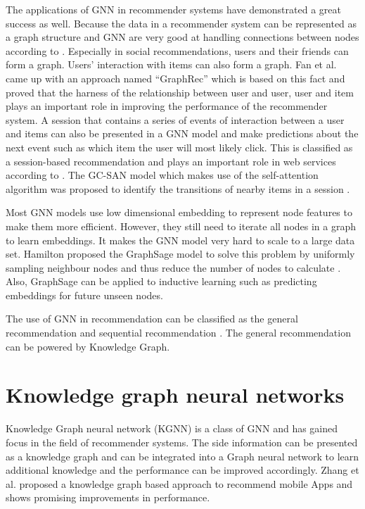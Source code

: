 \documentclass[11pt,twoside]{report}
\begin{document}
The applications of GNN in recommender systems have demonstrated a great success as well. Because the data in a recommender system can be represented as a graph structure and GNN are very good at handling connections between nodes according to \cite{wu_graph_2020}. Especially in social recommendations, users and their friends can form a graph. Users’ interaction with items can also form a graph. Fan et al. came up with an approach named “GraphRec” which is based on this fact \cite{fan_graph_2019} and proved that the harness of the relationship between user and user, user and item plays an important role in improving the performance of the recommender system. A session that contains a series of events of interaction between a user and items can also be presented in a GNN model and make predictions about the next event such as which item the user will most likely click. This is classified as a session-based recommendation and plays an important role in web services according to \cite{xu_graph_2019}. The GC-SAN model which makes use of the self-attention algorithm was proposed to identify the transitions of nearby items in a session \cite{xu_graph_2019}.

Most GNN models use low dimensional embedding to represent node features to make them more efficient. However, they still need to iterate all nodes in a graph to learn embeddings. It makes the GNN model very hard to scale to a large data set. Hamilton \cite{hamilton_inductive_2018} proposed the GraphSage model to solve this problem by uniformly sampling neighbour nodes and thus reduce the number of nodes to calculate \cite{hamilton_inductive_2018}. Also, GraphSage can be applied to inductive learning such as predicting embeddings for future unseen nodes.

The use of GNN in recommendation can be classified as the general recommendation and sequential recommendation \cite{wu_graph_2020}. The general recommendation can be powered by Knowledge Graph.

\section{Knowledge graph neural networks}
Knowledge Graph neural network (KGNN) is a class of GNN and has gained focus in the field of recommender systems. The side information can be presented as a knowledge graph and can be integrated into a Graph neural network to learn additional knowledge and the performance can be improved accordingly. Zhang et al. \cite{zhang_knowledge_2020} proposed a knowledge graph based approach to recommend mobile Apps and shows promising improvements in performance.
\end{document}
